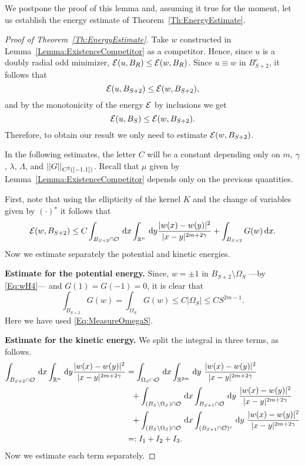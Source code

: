 We postpone the proof of this lemma and, assuming it true for the moment, let us establish the energy estimate of Theorem~\ref{Th:EnergyEstimate}. 

\begin{proof}[Proof of Theorem~\ref{Th:EnergyEstimate}]
	Take $w$ constructed in Lemma~\ref{Lemma:ExistenceCompetitor} as a competitor. Hence, since $u$ is a doubly radial odd minimizer, $ \mathcal{E} (u, B_R) \leq \mathcal{E} (w, B_R)$. Since $u\equiv w$ in $B_{S+2}^c$, it follows that
	$$ 
	\mathcal{E} (u, B_{S+2}) \leq \mathcal{E} (w, B_{S+2}), 
	$$
	and by the monotonicity of the energy $\mathcal{E}$ by inclusions we get
	$$ 
	\mathcal{E} (u, B_{S}) \leq \mathcal{E} (w, B_{S+2}). 
	$$
	Therefore, to obtain our result we only need to estimate $\mathcal{E} (w, B_{S+2})$. 
	
	
	In the following estimates, the letter $C$ will be a constant depending only on $m$, $\gamma$, $\lambda$, $\Lambda$, and $\left | \left |{G} \right | \right |_{C^2([-1,1])}$. Recall that $\mu$ given by Lemma~\ref{Lemma:ExistenceCompetitor} depends only on the previous quantities.
	
	First, note that using the ellipticity of the kernel $K$ and the change of variables given by $(\cdot)^\star$ it follows that
	$$ 
	\mathcal{E}(w,B_{S+2}) \leq C \int_{B_{S+2}\cap \mathcal{O}} \,\mathrm{d} x \int_{\mathbb{R}^n} \,\mathrm{d} y \frac{|w(x)-w(y)|^2}{|x-y|^{2m+2\gamma}} + \int_{B_{S+2}} G(w) \,\mathrm{d} x. 
	$$
	Now we estimate separately the potential and kinetic energies.
	
	\medskip
	
	\textbf{Estimate for the potential energy.}
	Since, $w=\pm 1$ in $B_{S+2} \setminus \Omega_S$ ---by \eqref{Eq:wH4}--- and $G(1) = G(-1) = 0$, it is clear that
	$$ 
	\int_{B_{S+2}} G(w) = \int_{\Omega_S} G(w) \leq C |\Omega_S| \leq C S^{2m-1}.
	$$  
	Here we have used \eqref{Eq:MeasureOmegaS}.
	
	\medskip
	
	\textbf{Estimate for the kinetic energy.}
	We split the integral in three terms, as follows.
	\begin{align*}
	\int_{B_{S+2}\cap \mathcal{O}} \,\mathrm{d} x \int_{\mathbb{R}^n} \,\mathrm{d} y \frac{|w(x)-w(y)|^2}{|x-y|^{2m+2\gamma}} &= \int_{\Omega_{S}\cap \mathcal{O}} \,\mathrm{d} x \int_{\mathbb{R}^{2m}} \,\mathrm{d} y \ \frac{|w(x)-w(y)|^2}{|x-y|^{2m+2\gamma}} \\
	&\ \ + \int_{(B_S\setminus \Omega_S)\cap \mathcal{O}} \,\mathrm{d} x \int_{B_{S+1}\cap \mathcal{O}} \,\mathrm{d} y \ \frac{|w(x)-w(y)|^2}{|x-y|^{2m+2\gamma}} \\
	&\ \ + \int_{(B_S\setminus \Omega_S)\cap \mathcal{O}} \,\mathrm{d} x \int_{(B_{S+1}\cap \mathcal{O})^c} \,\mathrm{d} y \ \frac{|w(x)-w(y)|^2}{|x-y|^{2m+2\gamma}} \\
	&=: I_1+I_2+I_3.
	\end{align*}
	Now we estimate each term separately.
	

\end{proof}

